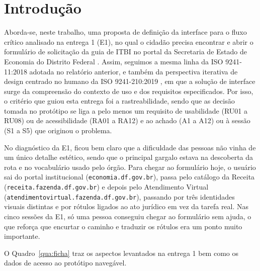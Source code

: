 \documentclass[
  12pt,
  oneside,
  a4paper,
  chapter=TITLE,
  section=TITLE,
  english,
  brazilian
]{abntex2}
\begin{document}
\tableofcontents*
\cleardoublepage

\textual

\chapter{Introdução}\label{cap:introducao}

Aborda-se, neste trabalho, uma proposta de definição da interface para o
fluxo crítico analisado na entrega 1 (E1), no qual o cidadão precisa encontrar
e abrir o formulário de solicitação da guia de ITBI no portal da Secretaria de
Estado de Economia do Distrito Federal \cite{seec}. Assim, seguimos a mesma linha da
ISO 9241-11:2018 \cite{iso9241-11-2018} adotada no relatório anterior, e também da perspectiva iterativa de design centrado no humano da ISO
9241-210:2019 \cite{iso9241-210-2019}, em que a solução de interface surge da compreensão do contexto de uso e dos requisitos especificados.
Por isso, o critério que guiou esta entrega foi a rastreabilidade, sendo que as
decisão tomada no protótipo se liga a pelo menos um requisito de
usabilidade (RU01 a RU08) ou de acessibilidade (RA01 a RA12) e ao achado (A1 a
A12) ou à sessão (S1 a S5) que originou o problema.

No diagnóstico da E1, ficou bem claro que a dificuldade das pessoas não vinha de um
único detalhe estético, sendo que o principal gargalo estava na descoberta da
rota e no vocabulário usado pelo órgão. Para chegar ao formulário hoje, o
usuário sai do portal institucional (\texttt{economia.df.gov.br}), passa pelo
catálogo da Receita (\texttt{receita.fazenda.df.gov.br}) e depois pelo
Atendimento Virtual (\texttt{atendimentovirtual.fazenda.df.gov.br}), passando
por três identidades visuais distintas e por rótulos ligados ao ato jurídico em
vez da tarefa real. Nas cinco sessões da E1, só uma pessoa conseguiu chegar ao
formulário sem ajuda, o que reforça que encurtar o caminho e traduzir os
rótulos era um ponto muito importante.

O Quadro~\ref{qua:ficha} traz os aspectos levantados na entrega 1 bem como os dados de
acesso ao protótipo navegável.
\end{document}

